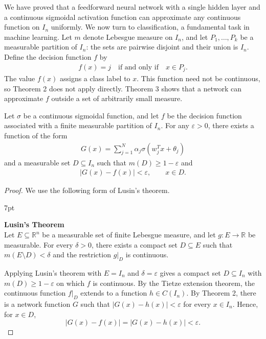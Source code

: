 \documentclass[12pt]{article}
\newenvironment{formal}{%
\def\FrameCommand{%
\hspace{1pt}%
{\color{Blue}\vrule width 2pt}%
{\color{formalshade}\vrule width 4pt}%
\colorbox{formalshade}%
}%
\MakeFramed{\advance\hsize-\width\FrameRestore}%
\noindent\hspace{-4.55pt}%
\begin{adjustwidth}{}{7pt}%
\vspace{2pt}\vspace{2pt}%
}
{%
\vspace{2pt}\end{adjustwidth}\endMakeFramed%
}
\begin{document}
We have proved that a feedforward neural network with a single hidden layer and a continuous sigmoidal activation function can approximate any continuous function on $I_n$ uniformly. We now turn to classification, a fundamental task in machine learning. Let $m$ denote Lebesgue measure on $I_n$, and let $P_1,\dots,P_k$ be a measurable partition of $I_n$: the sets are pairwise disjoint and their union is $I_n$. Define the decision function $f$ by
\begin{align*}
    f(x) = j \quad \text{if and only if} \quad x \in P_j.
\end{align*}
The value $f(x)$ assigns a class label to $x$. This function need not be continuous, so Theorem 2 does not apply directly. Theorem 3 shows that a network can approximate $f$ outside a set of arbitrarily small measure.
\begin{mytheorem}
    Let $\sigma$ be a continuous sigmoidal function, and let $f$ be the decision function associated with a finite measurable partition of $I_n$. For any $\varepsilon > 0$, there exists a function of the form
\begin{align*}
G(x) = \sum_{j=1}^{N} \alpha_j \sigma(w_j^T x + \theta_j)
\end{align*}
and a measurable set $D \subseteq I_n$ such that $m(D) \geq 1 - \varepsilon$ and
\begin{align*}
|G(x) - f(x)| < \varepsilon,\qquad x\in D.
\end{align*}
\end{mytheorem}

\begin{proof}
    We use the following form of Lusin's theorem.
    \begin{formal}
        \textbf{Lusin's Theorem}\\
        Let $E\subseteq\mathbb{R}^n$ be a measurable set of finite Lebesgue measure, and let $g:E\to\mathbb{R}$ be measurable. For every $\delta>0$, there exists a compact set $D\subseteq E$ such that $m(E\setminus D)<\delta$ and the restriction $g|_D$ is continuous.
    \end{formal}
    Applying Lusin's theorem with $E=I_n$ and $\delta=\varepsilon$ gives a compact set $D\subseteq I_n$ with $m(D)\geq1-\varepsilon$ on which $f$ is continuous. By the Tietze extension theorem, the continuous function $f|_D$ extends to a function $h\in C(I_n)$. By Theorem 2, there is a network function $G$ such that $|G(x)-h(x)|<\varepsilon$ for every $x\in I_n$. Hence, for $x\in D$,
    $$
    |G(x) - f(x)| = |G(x) - h(x)| < \varepsilon.
    $$
    \end{proof}
\end{document}

